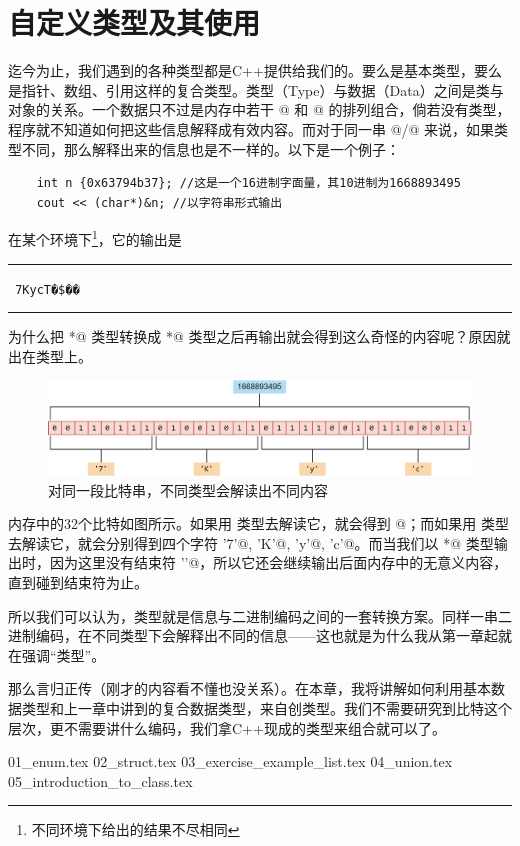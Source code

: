 \chapter{自定义类型及其使用}
迄今为止，我们遇到的各种类型都是C++提供给我们的。要么是基本类型，要么是指针、数组、引用这样的复合类型。类型（Type）与数据（Data）之间是类与对象的关系。一个数据只不过是内存中若干 @ 和 @ 的排列组合，倘若没有类型，程序就不知道如何把这些信息解释成有效内容。而对于同一串 @/@ 来说，如果类型不同，那么解释出来的信息也是不一样的。以下是一个例子：
\begin{lstlisting}
    int n {0x63794b37}; //这是一个16进制字面量，其10进制为1668893495
    cout << (char*)&n; //以字符串形式输出
\end{lstlisting}
在某个环境下\footnote{不同环境下给出的结果不尽相同}，它的输出是\\\noindent\rule{\linewidth}{.2pt}\texttt{
7KycT�\$��
}\\\noindent\rule{\linewidth}{.2pt}
为什么把 \lstinline@int*@ 类型转换成 \lstinline@char*@ 类型之后再输出就会得到这么奇怪的内容呢？原因就出在类型上。\par
\begin{figure}[htbp]
    \centering
    \includegraphics[width=\textwidth]{../images/generalized_parts/06_0_1_string_to_int_or_char.png}
    \caption{对同一段比特串，不同类型会解读出不同内容}
\end{figure}
内存中的32个比特如图所示。如果用 \lstinline@int@ 类型去解读它，就会得到 @；而如果用 \lstinline@char@ 类型去解读它，就会分别得到四个字符 \lstinline@'7'@, \lstinline@'K'@, \lstinline@'y'@, \lstinline@'c'@。而当我们以 \lstinline@char*@ 类型输出时，因为这里没有结束符 \lstinline@'\0'@，所以它还会继续输出后面内存中的无意义内容，直到碰到结束符为止。\par
所以我们可以认为，类型就是信息与二进制编码之间的一套转换方案。同样一串二进制编码，在不同类型下会解释出不同的信息——这也就是为什么我从第一章起就在强调``类型''。\par
那么言归正传（刚才的内容看不懂也没关系）。在本章，我将讲解如何利用基本数据类型和上一章中讲到的复合数据类型，来自创类型。我们不需要研究到比特这个层次，更不需要讲什么编码，我们拿C++现成的类型来组合就可以了。\par
{01_enum.tex}
{02_struct.tex}
{03_exercise_example_list.tex}
{04_union.tex}
{05_introduction_to_class.tex}
